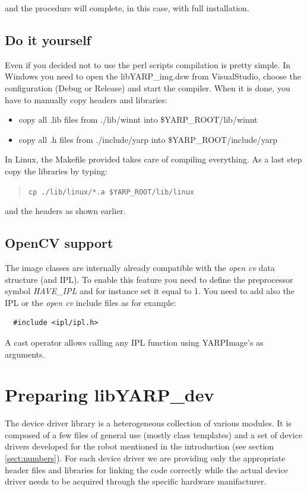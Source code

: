 \noindent and the procedure will complete, in this case, with full installation.


\subsection{Do it yourself}
Even if you decided not to use the perl scripts compilation is pretty simple. In Windows you need to open the libYARP\_img.dsw from VisualStudio, choose the configuration (Debug or Release) and start the compiler. When it is done, you have to manually copy headers and libraries:
\begin{itemize}
\item copy all .lib files from ./lib/winnt into \$YARP\_ROOT/lib/winnt
\item copy all .h files from ./include/yarp into \$YARP\_ROOT/include/yarp
\end{itemize}

In Linux, the Makefile provided takes care of compiling everything. As a last step copy the libraries by typing:
\begin{quote}
{\tt cp ./lib/linux/*.a \$YARP\_ROOT/lib/linux}
\end{quote}

\noindent and the headers as shown earlier. 


\subsection{OpenCV support}
The image classes are internally already compatible with the {\em open cv} data structure (and IPL). To enable this feature you need to define the preprocessor symbol {\em HAVE\_IPL} and for instance set it equal to 1. You need to add also the IPL or the {\em open cv} include files as for example:

\begin{verbatim}
  #include <ipl/ipl.h>
\end{verbatim}

A cast operator allows calling any IPL function using YARPImage's as arguments.
 
  
\section{Preparing libYARP\_dev}
The device driver library is a heterogeneous collection of various modules. It is composed of a few files of general use (mostly class templates) and a set of device drivers developed for the robot mentioned in the introduction (see section \ref{sect:numbers}). For each device driver we are providing only the appropriate header files and libraries for linking the code correctly while the actual device driver needs to be acquired through the specific hardware manifacturer.


